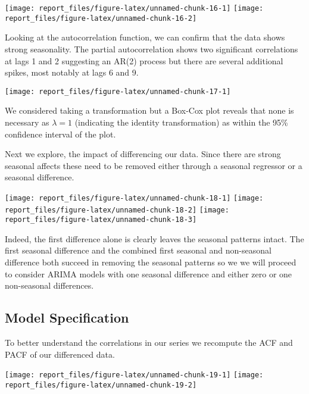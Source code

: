 \documentclass[
]{article}
\begin{document}
\begin{center}\texttt{[image: report\_files/figure-latex/unnamed-chunk-16-1]} \texttt{[image: report\_files/figure-latex/unnamed-chunk-16-2]} \end{center}

Looking at the autocorrelation function, we can confirm that the data
shows strong seasonality. The partial autocorrelation shows two
significant correlations at lags 1 and 2 suggesting an AR(2) process but
there are several additional spikes, most notably at lags 6 and 9.

\begin{center}\texttt{[image: report\_files/figure-latex/unnamed-chunk-17-1]} \end{center}

We considered taking a transformation but a Box-Cox plot reveals that
none is necessary as \(\lambda = 1\) (indicating the identity
transformation) as within the 95\% confidence interval of the plot.

Next we explore, the impact of differencing our data. Since there are
strong seasonal affects these need to be removed either through a
seasonal regressor or a seasonal difference.

\begin{center}\texttt{[image: report\_files/figure-latex/unnamed-chunk-18-1]} \texttt{[image: report\_files/figure-latex/unnamed-chunk-18-2]} \texttt{[image: report\_files/figure-latex/unnamed-chunk-18-3]} \end{center}

Indeed, the first difference alone is clearly leaves the seasonal
patterns intact. The first seasonal difference and the combined first
seasonal and non-seasonal difference both succeed in removing the
seasonal patterns so we we will proceed to consider ARIMA models with
one seasonal difference and either zero or one non-seasonal differences.

\subsection{Model Specification}

To better understand the correlations in our series we recompute the ACF
and PACF of our differenced data.

\begin{center}\texttt{[image: report\_files/figure-latex/unnamed-chunk-19-1]} \texttt{[image: report\_files/figure-latex/unnamed-chunk-19-2]} \end{center}
\end{document}
